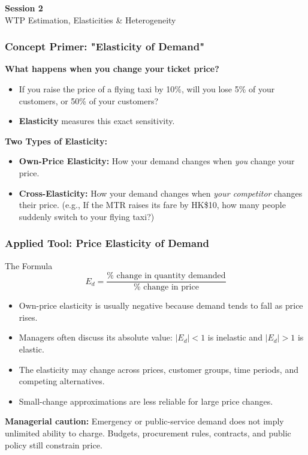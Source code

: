 \documentclass{beamer}
\begin{document}
\begin{frame}[c]
  \begin{center}
    \huge\color{cuhkpurple}\textbf{Session 2}\\
    \vspace{0.5cm}
    \Large WTP Estimation, Elasticities \& Heterogeneity
  \end{center}
\end{frame}

\begin{frame}[t]
  \frametitle{Concept Primer: "Elasticity of Demand"}
  
  \textbf{What happens when you change your ticket price?}
  \begin{itemize}
      \item If you raise the price of a flying taxi by 10\%, will you lose 5\% of your customers, or 50\% of your customers?
      \item \textbf{Elasticity} measures this exact sensitivity.
  \end{itemize}

  \vspace{0.3cm}
  \textbf{Two Types of Elasticity:}
  \begin{itemize}
      \item \textbf{Own-Price Elasticity:} How your demand changes when \textit{you} change your price.
      \item \textbf{Cross-Elasticity:} How your demand changes when \textit{your competitor} changes their price. (e.g., If the MTR raises its fare by HK\$10, how many people suddenly switch to your flying taxi?)
  \end{itemize}
\end{frame}

\begin{frame}[t]
\frametitle{Applied Tool: Price Elasticity of Demand}
\begin{block}{The Formula}
\[
E_d=\frac{\%\text{ change in quantity demanded}}{\%\text{ change in price}}
\]
\end{block}
\begin{itemize}
\item Own-price elasticity is usually negative because demand tends to fall as price rises.
\item Managers often discuss its absolute value: $|E_d|<1$ is inelastic and $|E_d|>1$ is elastic.
\item The elasticity may change across prices, customer groups, time periods, and competing alternatives.
\item Small-change approximations are less reliable for large price changes.
\end{itemize}
\textbf{Managerial caution:} Emergency or public-service demand does not imply unlimited ability to charge. Budgets, procurement rules, contracts, and public policy still constrain price.
\end{frame}
\end{document}
